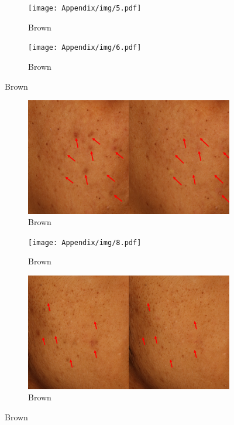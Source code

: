 \begin{appendices}
\begin{spacing}{1.5}
\begin{figure}[h]
    \begin{subfigure}{.5\textwidth}
        \centering
        \texttt{[image: Appendix/img/5.pdf]}
        \caption{Brown}
      \end{subfigure}%
      \begin{subfigure}{.5\textwidth}
        \centering
        \texttt{[image: Appendix/img/6.pdf]}
        \caption{Brown}
      \end{subfigure}
\end{figure}
\begin{figure}[p]\ContinuedFloat
    \begin{subfigure}{.5\textwidth}
        \centering
        \includegraphics[width=.9\linewidth]{Appendix/img/7.pdf}
        \caption{Brown}
      \end{subfigure}%
      \begin{subfigure}{.5\textwidth}
        \centering
        \texttt{[image: Appendix/img/8.pdf]}
        \caption{Brown}
      \end{subfigure}
    \begin{subfigure}{.5\textwidth}
        \centering
        \includegraphics[width=.9\linewidth]{Appendix/img/9.pdf}
        \caption{Brown}
      \end{subfigure}%

\end{figure}
\end{spacing}
\end{appendices}
